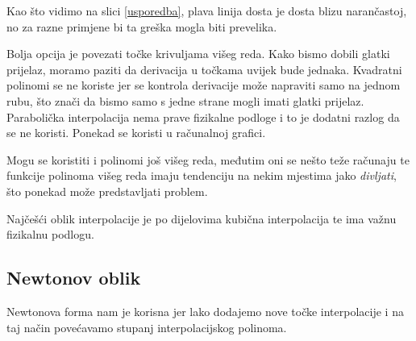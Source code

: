 \documentclass[12pt,a4paper]{report}
\begin{document}
	Kao što vidimo na slici \ref{usporedba}, plava linija dosta je dosta blizu narančastoj, no za razne primjene bi ta greška mogla biti prevelika.
	
	Bolja opcija je povezati točke krivuljama višeg reda. Kako bismo dobili glatki prijelaz, moramo paziti da derivacija u točkama uvijek bude jednaka. Kvadratni polinomi se ne koriste jer se kontrola derivacije može napraviti samo na jednom rubu, što znači da bismo samo s jedne strane mogli imati glatki prijelaz. Parabolička interpolacija nema prave fizikalne podloge i to je dodatni razlog da se ne koristi. Ponekad se koristi u računalnoj grafici.\cite{hari} 
	
	Mogu se koristiti i polinomi još višeg reda, međutim oni se nešto teže računaju te funkcije polinoma višeg reda imaju tendenciju na nekim mjestima jako \textit{divljati}, što ponekad može predstavljati problem\cite{ChEn2450}. 
	
	Najčešći oblik interpolacije je po dijelovima kubična interpolacija te ima važnu fizikalnu podlogu\cite{hari}.
	\subsection{Newtonov oblik}
	Newtonova forma\cite{hari} nam je korisna jer lako dodajemo nove točke interpolacije i na taj način povećavamo stupanj interpolacijskog polinoma. 
	
\end{document}
